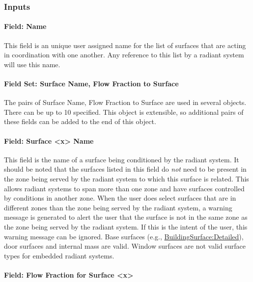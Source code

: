 \subsubsection{Inputs}\label{inputs-8-017}

\paragraph{Field: Name}\label{field-name-8-015}

This field is an unique user assigned name for the list of surfaces that are acting in coordination with one another. Any reference to this list by a radiant system will use this name.

\paragraph{Field Set: Surface Name, Flow Fraction to Surface}\label{field-set-surface-name-flow-fraction-to-surface}

The pairs of Surface Name, Flow Fraction to Surface are used in several objects. There can be up to 10 specified. This object is extensible, so additional pairs of these fields can be added to the end of this object.

\paragraph{Field: Surface \textless{}x\textgreater{} Name}\label{field-surface-x-name-2}

This field is the name of a surface being conditioned by the radiant system. It should be noted that the surfaces listed in this field do \emph{not} need to be present in the zone being served by the radiant system to which this surface is related. This allows radiant systems to span more than one zone and have surfaces controlled by conditions in another zone. When the user does select surfaces that are in different zones than the zone being served by the radiant system, a warning message is generated to alert the user that the surface is not in the same zone as the zone being served by the radiant system. If this is the intent of the user, this warning message can be ignored. Base surfaces (e.g., \hyperref[buildingsurfacedetailed]{BuildingSurface:Detailed}), door surfaces and internal mass are valid. Window surfaces are not valid surface types for embedded radiant systems.

\paragraph{Field: Flow Fraction for Surface \textless{}x\textgreater{}}\label{field-flow-fraction-for-surface-x}

